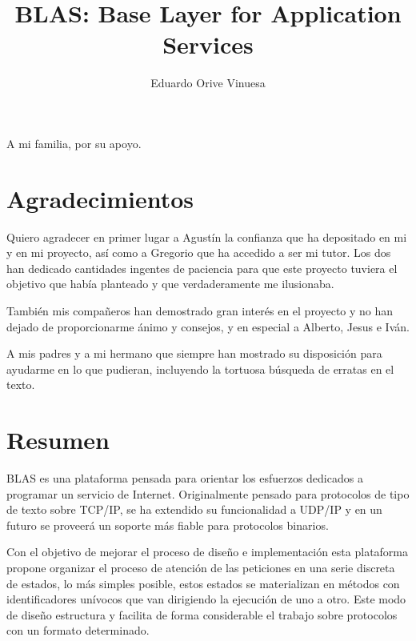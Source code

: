 \documentclass[a4paper,spanish,12pt]{book}
\title{BLAS: Base Layer for Application Services}
\author{Eduardo Orive Vinuesa}
\begin{document}


\cleardoublepage




\cleardoublepage

\vspace*{6cm}
	\begin{flushright}
		\begin{em}
			A mi familia, por su apoyo.
       		\end{em}
	\end{flushright}
\cleardoublepage

\chapter*{Agradecimientos}

Quiero agradecer en primer lugar a Agustín la confianza que ha depositado en mi y en mi proyecto, así como a Gregorio que ha accedido a ser mi tutor. Los dos han dedicado cantidades ingentes de paciencia para que este proyecto tuviera el objetivo que había planteado y que verdaderamente me ilusionaba.

Tambi\'en mis compañeros han demostrado gran inter\'es en el proyecto y no han dejado de proporcionarme ánimo y consejos, y en especial a Alberto, Jesus e Iván.

A mis padres y a mi hermano que siempre han mostrado su disposición para ayudarme en lo que pudieran, incluyendo la tortuosa búsqueda de erratas en el texto.
\cleardoublepage

\chapter*{Resumen}
BLAS es una plataforma pensada para orientar los esfuerzos dedicados a programar un servicio de Internet. Originalmente pensado para protocolos de tipo de texto sobre TCP/IP, se ha extendido su funcionalidad a UDP/IP y en un futuro se proveerá un soporte más fiable para protocolos binarios.

Con el objetivo de mejorar el proceso de diseño e implementación esta plataforma propone organizar el proceso de atención de las peticiones en una serie discreta de estados, lo más simples posible, estos estados se materializan en m\'etodos con identificadores unívocos que van dirigiendo la ejecución de uno a otro. Este modo de diseño estructura y facilita de forma considerable el trabajo sobre protocolos con un formato determinado.
\end{document}
